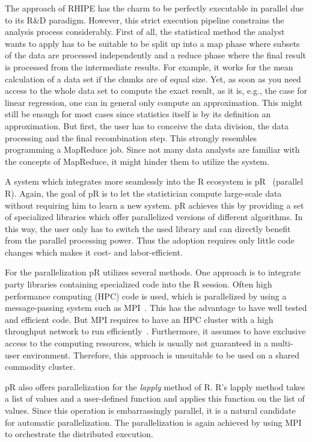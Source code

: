 The approach of RHIPE has the charm to be perfectly executable in parallel due to its R\&D paradigm.
However, this strict execution pipeline constrains the analysis process considerably.
First of all, the statistical method the analyst wants to apply has to be suitable to be split up into a map phase where subsets of the data are processed independently and a reduce phase where the final result is processed from the intermediate results.
For example, it works for the mean calculation of a data set if the chunks are of equal size.
Yet, as soon as you need access to the whole data set to compute the exact result, as it is, e.g., the case for linear regression, one can in general only compute an approximation.
This might still be enough for most cases since statistics itself is by its definition an approximation.
But first, the user has to conceive the data division, the data processing and the final recombination step.
This strongly resembles programming a MapReduce job.
Since not many data analysts are familiar with the concepts of MapReduce, it might hinder them to utilize the system.

A system which integrates more seamlessly into the R ecosystem is pR~\cite{samatova:2009a} (parallel R).
Again, the goal of pR is to let the statistician compute large-scale data without requiring him to learn a new system.
pR achieves this by providing a set of specialized libraries which offer parallelized versions of different algorithms.
In this way, the user only has to switch the used library and can directly benefit from the parallel processing power.
Thus the adoption requires only little code changes which makes it cost- and labor-efficient.

For the parallelization pR utilizes several methods.
One approach is to integrate  party libraries containing specialized code into the R session.
Often high performance computing (HPC) code is used, which is parallelized by using a message-passing system such as MPI~\cite{gropp:pc1996a,lusk:2009a}.
This has the advantage to have well tested and efficient code.
But MPI requires to have an HPC cluster with a high throughput network to run efficiently~\cite{sur:2006a}.
Furthermore, it assumes to have exclusive access to the computing resources, which is usually not guaranteed in a multi-user environment.
Therefore, this approach is unsuitable to be used on a shared commodity cluster.

pR also offers parallelization for the \emph{lapply} method of R.
R's lapply method takes a list of values and a user-defined function and applies this function on the list of values.
Since this operation is embarrassingly parallel, it is a natural candidate for automatic parallelization.
The parallelization is again achieved by using MPI to orchestrate the distributed execution.

